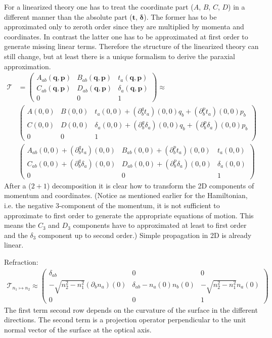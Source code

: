 \documentclass[12pt,a4paper,twoside,openright,BCOR10mm,headsepline,titlepage,abstracton,chapterprefix,final]{scrreprt}
\newcommand\Vector[1]{{\mathbf{#1}}}
\begin{document}
For a linearized theory one has to treat the coordinate part ($A$, $B$, $C$, $D$) in a different manner than the absolute part ($\Vector{t}$, $\Vector{\delta}$).
The former has to be approximated only to zeroth order since they are multiplied by momenta and coordinates. In contrast the latter one
has to be approximated at first order to generate missing linear terms. Therefore the structure of the linearized theory can still change, but
at least there is a unique formalism to derive the paraxial approximation.
\begin{align}
  \mathcal{T} &= \begin{pmatrix}
  A_{ab}(\Vector{q},\Vector{p}) & B_{ab}(\Vector{q},\Vector{p}) & t_{a}(\Vector{q},\Vector{p})\\
  C_{ab}(\Vector{q},\Vector{p}) & D_{ab}(\Vector{q},\Vector{p}) & \delta_{a}(\Vector{q},\Vector{p})\\
  0 & 0 & 1 
 \end{pmatrix}
 \approx \nonumber\\&
  \begin{pmatrix}
  A(0,0) & B(0,0) & t_a(0,0) + (\partial^q_b t_a)(0,0) q_b + (\partial^p_b t_a)(0,0) p_b\\
  C(0,0) & D(0,0) & \delta_a(0,0) + (\partial^q_b \delta_a)(0,0) q_b + (\partial^p_b \delta_a)(0,0) p_b\\
  0 & 0 & 1 
 \end{pmatrix} \nonumber\\&
  \begin{pmatrix}
  A_{ab}(0,0)  + (\partial^q_b t_a)(0,0) & B_{ab}(0,0)+ (\partial^p_b t_a)(0,0) & t_a(0,0) \\
  C_{ab}(0,0)+ (\partial^q_b \delta_a)(0,0) & D_{ab}(0,0)  + (\partial^p_b \delta_a)(0,0)& \delta_a(0,0)\\
  0 & 0 & 1 
 \end{pmatrix}
\end{align}
After a ($2+1$) decomposition it is clear how to transform the 2D components of momentum and coordinates. (Notice
as mentioned earlier for the Hamiltonian, i.e. the negative 3-component of the momentum, it is not sufficient
to approximate to first order to generate the appropriate equations of motion. This means the $C_3$ and $D_3$ components
have to approximated at least to first order and the $\delta_3$ component up to second order.) Simple propagation in 2D is already linear.

Refraction:
\begin{align}
  \mathcal{T}_{n_1\mapsto n_2} \approx \begin{pmatrix}
  \delta_{ab} & 0 & 0 \\
   -\sqrt{n_2^2 - n_1^2} (\partial_b n_a)(0) & \delta_{ab} - n_a(0) n_b(0)& -\sqrt{n_2^2 - n_1^2} n_a(0)\\
  0 & 0 & 1 
 \end{pmatrix}
\end{align}
The first term second row depends on the curvature of the surface in the different directions. The second term is
a projection operator perpendicular to the unit normal vector of the surface at the optical axis.
\end{document}
